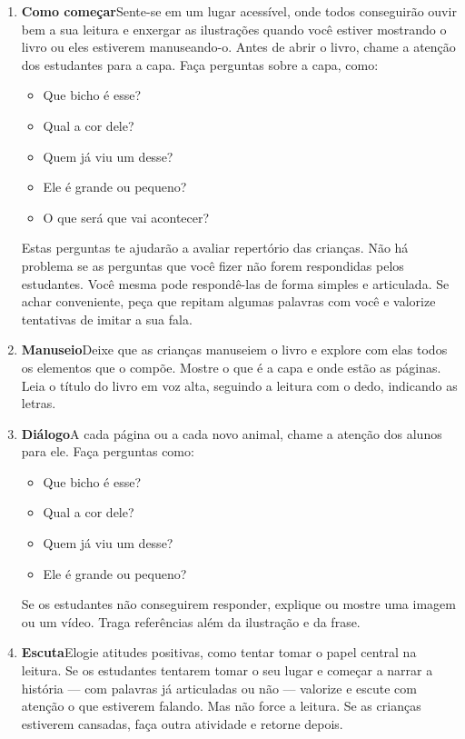 \documentclass[11pt]{extarticle}
\begin{document}
\begin{enumerate}
\item \textbf{Como começar}\quad Sente-se em um lugar acessível, 
onde todos conseguirão ouvir bem a sua leitura e enxergar as ilustrações 
quando você estiver mostrando o livro ou eles estiverem manuseando-o. 
Antes de abrir o livro, chame a atenção dos estudantes para a capa. 
Faça perguntas sobre a capa, como: 

\begin{itemize}
\item Que bicho é esse?
\item Qual a cor dele? 
\item Quem já viu um desse?
\item Ele é grande ou pequeno?
\item O que será que vai acontecer?
\end{itemize}

Estas perguntas te ajudarão a avaliar repertório das crianças. 
Não há problema se as perguntas que você fizer não forem respondidas pelos 
estudantes. Você mesma pode respondê-las de forma simples e articulada. Se achar 
conveniente, peça que repitam algumas palavras com você e valorize tentativas 
de imitar a sua fala. 
 
\item \textbf{Manuseio}\quad Deixe que as crianças manuseiem o livro 
e explore com elas todos os elementos que o compõe. Mostre o que é a 
capa e onde estão as páginas. Leia o título do livro em voz alta, seguindo 
a leitura com o dedo, indicando as letras. 

\item \textbf{Diálogo}\quad A cada página ou a cada novo animal,
chame a atenção dos alunos para ele. Faça perguntas como:

\begin{itemize}
\item Que bicho é esse?
\item Qual a cor dele?
\item Quem já viu um desse?
\item Ele é grande ou pequeno?
\end{itemize}

Se os estudantes não conseguirem responder, explique ou mostre uma 
imagem ou um vídeo. Traga referências além da ilustração e da frase. 


\item \textbf{Escuta}\quad Elogie atitudes positivas, como 
tentar tomar o papel central na leitura. Se os estudantes tentarem 
tomar o seu lugar e começar a narrar a história --- com palavras já articuladas 
ou não --- valorize e escute com atenção o que estiverem falando. Mas não 
force a leitura. Se as crianças estiverem cansadas, faça outra atividade 
e retorne depois. 


\end{enumerate}
\end{document}
